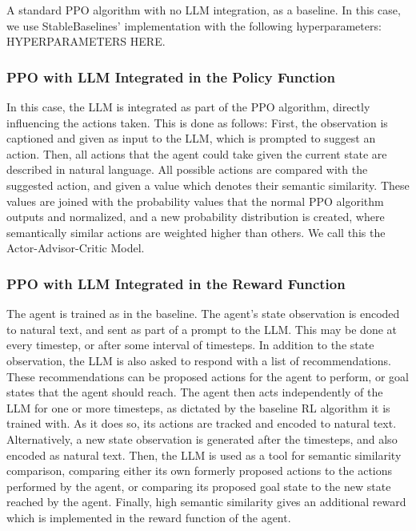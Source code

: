 \documentclass[conference]{IEEEtran}
\begin{document}
A standard PPO algorithm with no LLM integration, as a baseline. In this case, we use StableBaselines' implementation with the following hyperparameters: HYPERPARAMETERS HERE.

\subsubsection{PPO with LLM Integrated in the Policy Function}

In this case, the LLM is integrated as part of the PPO algorithm, directly influencing the actions taken. This is done as follows: First, the observation is captioned and given as input to the LLM, which is prompted to suggest an action. Then, all actions that the agent could take given the current state are described in natural language. All possible actions are compared with the suggested action, and given a value which denotes their semantic similarity. These values are joined with the probability values that the normal PPO algorithm outputs and normalized, and a new probability distribution is created, where semantically similar actions are weighted higher than others. We call this the Actor-Advisor-Critic Model.

\subsubsection{PPO with LLM Integrated in the Reward Function}

The agent is trained as in the baseline. The agent's state observation is encoded to natural text, and sent as part of a prompt to the LLM. This may be done at every timestep, or after some interval of timesteps. In addition to the state observation, the LLM is also asked to respond with a list of recommendations. These recommendations can be proposed actions for the agent to perform, or goal states that the agent should reach. The agent then acts independently of the LLM for one or more timesteps, as dictated by the baseline RL algorithm it is trained with. As it does so, its actions are tracked and encoded to natural text. Alternatively, a new state observation is generated after the timesteps, and also encoded as natural text. Then, the LLM is used as a tool for semantic similarity comparison, comparing either its own formerly proposed actions to the actions performed by the agent, or comparing its proposed goal state to the new state reached by the agent. Finally, high semantic similarity gives an additional reward which is implemented in the reward function of the agent. 
\end{document}
